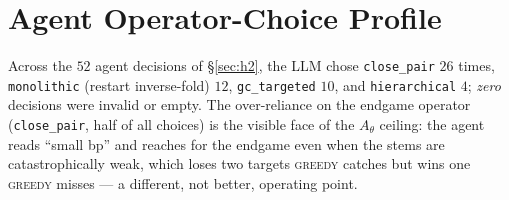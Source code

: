\documentclass[11pt]{article}
\newcommand{\Ath}{A_{\theta}}
\begin{document}
\section{Agent Operator-Choice Profile}\label{app:ops}
Across the $52$ agent decisions of \S\ref{sec:h2}, the LLM chose \texttt{close\_pair} $26$ times,
\texttt{monolithic} (restart inverse-fold) $12$, \texttt{gc\_targeted} $10$, and \texttt{hierarchical}
$4$; \emph{zero} decisions were invalid or empty. The over-reliance on the endgame operator
(\texttt{close\_pair}, half of all choices) is the visible face of the $\Ath$ ceiling: the agent reads
``small bp'' and reaches for the endgame even when the stems are catastrophically weak, which loses two
targets \textsc{greedy} catches but wins one \textsc{greedy} misses --- a different, not better,
operating point.

\small
\end{document}
